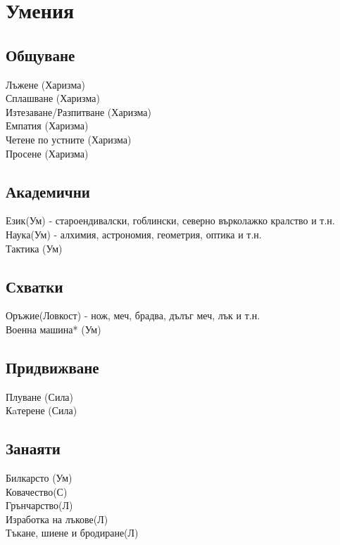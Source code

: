 \chapter{Умения}
\section{Общуване}
Лъжене (Харизма)                  \\
Сплашване (Харизма)               \\
Изтезаване/Разпитване (Харизма)   \\
Емпатия (Харизма)                 \\
Четене по устните (Харизма)       \\
Просене (Харизма)                  \\

\section{Академични}
Език(Ум) - староендивалски, гоблински, северно върколажко кралство и т.н.  \\
Наука(Ум) - алхимия, астрономия, геометрия, оптика и т.н.  \\
Тактика (Ум)                      \\

\section{Схватки}
Оръжие(Ловкост) - нож, меч, брадва, дълъг меч, лък и т.н.  \\
Военна машина* (Ум)               \\

\section{Придвижване}
Плуване (Сила)                    \\
Кaтерене (Сила)                   \\

\section{Занаяти}
Билкарсто (Ум)                    \\
Ковачество(С)                     \\
Грънчарство(Л)                    \\
Изработка на лъкове(Л)            \\
Тъкане, шиене и бродиране(Л)      \\

